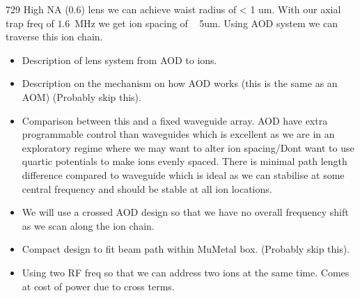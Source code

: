 \documentclass[12pt]{iopart}
\begin{document}
729 High NA (0.6) lens we can achieve waist radius of < 1 um.  With
our axial trap freq of $1.6$~MHz we get ion spacing of ~ 5um.  Using AOD
system we can traverse this ion chain.
\begin{itemize}
\item Description of lens system from AOD to ions.
\item Description on the mechanism on how AOD works (this is the same
  as an AOM) (Probably skip this).
\item Comparison between this and a fixed waveguide array.
AOD have extra programmable control than waveguides which is
excellent as we are in an exploratory regime where we may want to
alter ion spacing/Dont want to use quartic potentials to make ions
evenly spaced.
There is minimal path length difference compared to waveguide which is
ideal as we can stabilise at some central frequency and should be
stable at all ion locations.
\item We will use a crossed AOD design so that we have no overall frequency
shift as we scan along the ion chain.
\item Compact design to fit beam path within MuMetal box. (Probably skip this).
\item Using two RF freq so that we can address two ions at the same
time. Comes at cost of power due to cross terms.
\end{itemize}



\end{document}
